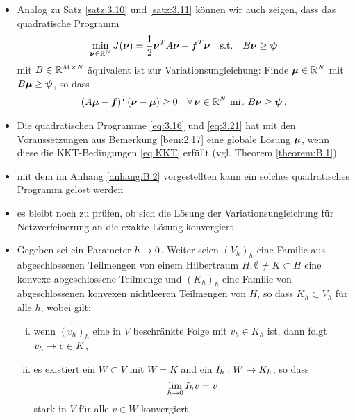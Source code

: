 \begin{itemize}
\item \begin{bem}
Analog zu Satz \ref{satz:3.10} und \ref{satz:3.11} können wir auch zeigen, dass das quadratische Programm
\begin{align}\label{eq:3.21}
	\min_{\boldsymbol\nu \in \mathbb{R}^N} J(\boldsymbol\nu) = \frac 1 2 \boldsymbol \nu^T A \boldsymbol \nu - \boldsymbol f^T \boldsymbol \nu \quad \text{s.t.} \quad B\boldsymbol\nu \ge \boldsymbol \psi
\end{align}
mit $B \in \mathbb{R}^{M\times N}$ äquivalent ist zur Variationsungleichung: Finde $\boldsymbol\mu \in \mathbb{R}^N$ mit $B\boldsymbol\mu \ge \boldsymbol \psi$, so dass
\begin{align}\label{eq:3.22}
	(A\boldsymbol\mu - \boldsymbol f)^T (\boldsymbol\nu-\boldsymbol\mu) \ge 0 \quad \forall\, \boldsymbol\nu \in \mathbb{R}^N \text{ mit } B \boldsymbol \nu \ge \boldsymbol\psi \, .
\end{align}
\end{bem}


\item \begin{bem}
Die quadratischen Programme \eqref{eq:3.16} und \eqref{eq:3.21} hat mit den Voraussetzungen aus Bemerkung \ref{bem:2.17} eine globale Lösung $\boldsymbol\mu$, wenn diese die KKT-Bedingungen \eqref{eq:KKT} erfüllt (vgl. Theorem \ref{theorem:B.1}).
\end{bem}

\item mit dem im Anhang \ref{anhang:B.2} vorgestellten  kann ein solches quadratisches Programm gelöst werden

\item es bleibt noch zu prüfen, ob sich die Lösung der Variationsungleichung für Netzverfeinerung an die exakte Lösung konvergiert

\item \begin{vor}
Gegeben sei ein Parameter $h \rightarrow 0$. Weiter seien $(V_h)_h$ eine Familie aus abgeschlossenen Teilmengen von einem Hilbertraum $H, \emptyset \not= K \subset H$ eine konvexe abgeschlossene Teilmenge und $(K_h)_h$ eine Familie von abgeschlossenen konvexen nichtleeren Teilmengen von $H$, so dass $K_h \subset V_h$ für alle $h$, wobei gilt:
\begin{enumerate}[(i)]
\item wenn $(v_h)_h$ eine in $V$ beschränkte Folge mit $v_h \in K_h$ ist, dann folgt $v_h \rightarrow v \in K$,
\item es existiert ein $W \subset V$ mit $\overline W = K$ and ein $I_h: W \rightarrow K_h$, so dass
\[
	\lim_{h\rightarrow 0} I_h v = v
\]
stark in $V$ für alle $v \in W$ konvergiert.
\end{enumerate}
\end{vor}


\end{itemize}
